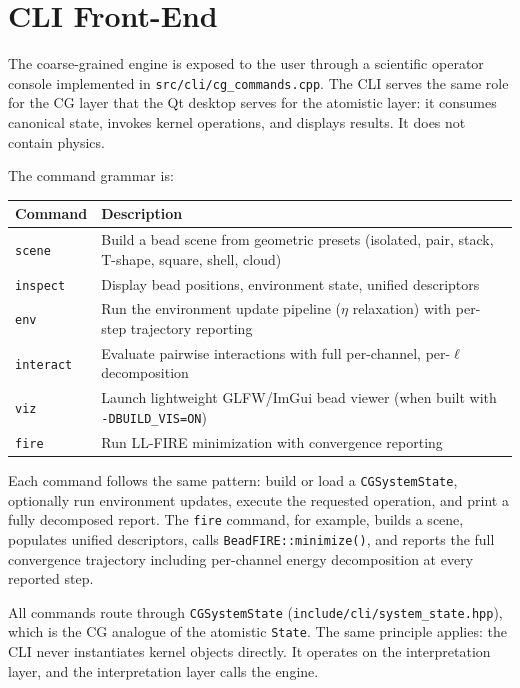 ﻿\documentclass[11pt]{article}
\newcommand{\file}[1]{\texttt{#1}}
\newcommand{\type}[1]{\texttt{#1}}
\newcommand{\op}[1]{\texttt{#1}}
\begin{document}
\section{CLI Front-End}
\label{sec:cli}

The coarse-grained engine is exposed to the user through a scientific operator
console implemented in \file{src/cli/cg\_commands.cpp}. The CLI serves the
same role for the CG layer that the Qt desktop serves for the atomistic layer:
it consumes canonical state, invokes kernel operations, and displays results.
It does not contain physics.

The command grammar is:

\begin{center}
\begin{tabular}{lp{8cm}}
\toprule
Command & Description \\
\midrule
\texttt{scene}    & Build a bead scene from geometric presets
                    (isolated, pair, stack, T-shape, square, shell, cloud) \\
\texttt{inspect}  & Display bead positions, environment state,
                    unified descriptors \\
\texttt{env}      & Run the environment update pipeline ($\eta$ relaxation)
                    with per-step trajectory reporting \\
\texttt{interact} & Evaluate pairwise interactions with full per-channel,
                    per-$\ell$ decomposition \\
\texttt{viz}      & Launch lightweight GLFW/ImGui bead viewer
                    (when built with \texttt{-DBUILD\_VIS=ON}) \\
\texttt{fire}     & Run LL-FIRE minimization with convergence reporting \\
\bottomrule
\end{tabular}
\end{center}

Each command follows the same pattern: build or load a
\type{CGSystemState}, optionally run environment updates, execute the
requested operation, and print a fully decomposed report. The
\texttt{fire} command, for example, builds a scene, populates unified
descriptors, calls \op{BeadFIRE::minimize()}, and reports the full
convergence trajectory including per-channel energy decomposition at every
reported step.

All commands route through \type{CGSystemState}
(\file{include/cli/system\_state.hpp}), which is the CG analogue of the
atomistic \type{State}. The same principle applies: the CLI never
instantiates kernel objects directly. It operates on the interpretation layer,
and the interpretation layer calls the engine.
\end{document}
